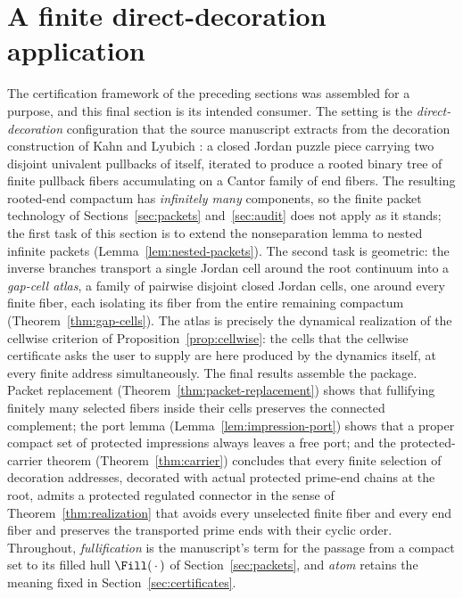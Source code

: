 
\section{A finite direct-decoration application}\label{sec:decoration}

The certification framework of the preceding sections was assembled for a
purpose, and this final section is its intended consumer.  The setting is
the \emph{direct-decoration} configuration that the source manuscript
\cite{MWman} extracts from the decoration construction of Kahn and Lyubich
\cite{KL08}: a closed Jordan puzzle piece carrying two disjoint univalent
pullbacks of itself, iterated to produce a rooted binary tree of finite
pullback fibers accumulating on a Cantor family of end fibers.  The
resulting rooted-end compactum has \emph{infinitely many} components, so
the finite packet technology of Sections~\ref{sec:packets}
and~\ref{sec:audit} does not apply as it stands; the first task of this
section is to extend the nonseparation lemma to nested infinite packets
(Lemma~\ref{lem:nested-packets}).  The second task is geometric: the
inverse branches transport a single Jordan cell around the root continuum
into a \emph{gap-cell atlas}, a family of pairwise disjoint closed Jordan
cells, one around every finite fiber, each isolating its fiber from the
entire remaining compactum (Theorem~\ref{thm:gap-cells}).  The atlas is
precisely the dynamical realization of the cellwise criterion of
Proposition~\ref{prop:cellwise}: the cells that the cellwise certificate
asks the user to supply are here produced by the dynamics itself, at every
finite address simultaneously.  The final results assemble the package.
Packet replacement (Theorem~\ref{thm:packet-replacement}) shows that
fullifying finitely many selected fibers inside their cells preserves the
connected complement; the port lemma (Lemma~\ref{lem:impression-port})
shows that a proper compact set of protected impressions always leaves a
free port; and the protected-carrier theorem (Theorem~\ref{thm:carrier})
concludes that every finite selection of decoration addresses, decorated
with actual protected prime-end chains at the root, admits a protected
regulated connector in the sense of Theorem~\ref{thm:realization} that
avoids every unselected finite fiber and every end fiber and preserves the
transported prime ends with their cyclic order.  Throughout,
\emph{fullification} is the manuscript's term for the passage from a
compact set to its filled hull $\Fill(\,\cdot\,)$ of
Section~\ref{sec:packets}, and \emph{atom} retains the meaning fixed in
Section~\ref{sec:certificates}.

